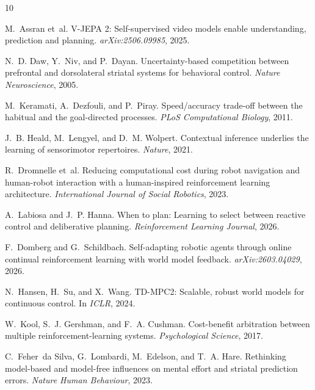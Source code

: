 \documentclass[11pt,a4paper]{article}
\begin{document}
\begin{thebibliography}{10}

M.~Assran et~al.
\newblock V-JEPA 2: Self-supervised video models enable understanding, prediction and planning.
\newblock \emph{arXiv:2506.09985}, 2025.

N.~D. Daw, Y.~Niv, and P.~Dayan.
\newblock Uncertainty-based competition between prefrontal and dorsolateral striatal systems for behavioral control.
\newblock \emph{Nature Neuroscience}, 2005.

M.~Keramati, A.~Dezfouli, and P.~Piray.
\newblock Speed/accuracy trade-off between the habitual and the goal-directed processes.
\newblock \emph{PLoS Computational Biology}, 2011.

J.~B. Heald, M.~Lengyel, and D.~M. Wolpert.
\newblock Contextual inference underlies the learning of sensorimotor repertoires.
\newblock \emph{Nature}, 2021.

R.~Dromnelle et~al.
\newblock Reducing computational cost during robot navigation and human-robot interaction with a human-inspired reinforcement learning architecture.
\newblock \emph{International Journal of Social Robotics}, 2023.

A.~Labiosa and J.~P. Hanna.
\newblock When to plan: Learning to select between reactive control and deliberative planning.
\newblock \emph{Reinforcement Learning Journal}, 2026.

F.~Domberg and G.~Schildbach.
\newblock Self-adapting robotic agents through online continual reinforcement learning with world model feedback.
\newblock \emph{arXiv:2603.04029}, 2026.

N.~Hansen, H.~Su, and X.~Wang.
\newblock TD-MPC2: Scalable, robust world models for continuous control.
\newblock In \emph{ICLR}, 2024.

W.~Kool, S.~J. Gershman, and F.~A. Cushman.
\newblock Cost-benefit arbitration between multiple reinforcement-learning systems.
\newblock \emph{Psychological Science}, 2017.

C.~Feher~da Silva, G.~Lombardi, M.~Edelson, and T.~A. Hare.
\newblock Rethinking model-based and model-free influences on mental effort and striatal prediction errors.
\newblock \emph{Nature Human Behaviour}, 2023.

\end{thebibliography}
\end{document}
